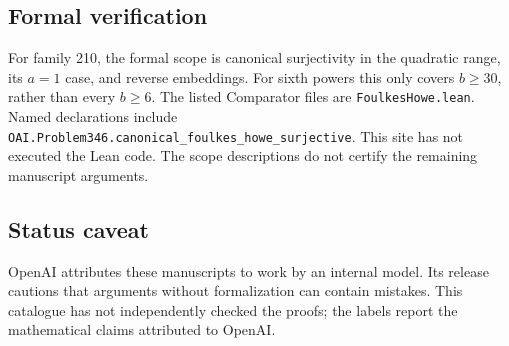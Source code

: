 \documentclass[11pt]{article}
\begin{document}
\subsection{Formal verification}
For family 210, the formal scope is canonical surjectivity in the quadratic range, its $a=1$ case, and reverse embeddings. For sixth powers this only covers $b\geq30$, rather than every $b\geq6$. The listed Comparator files are \texttt{FoulkesHowe.lean}. Named declarations include \texttt{OAI.Problem346.canonical\_foulkes\_howe\_surjective}. This site has not executed the Lean code. The scope descriptions do not certify the remaining manuscript arguments.

\subsection{Status caveat}
OpenAI attributes these manuscripts to work by an internal model. Its release cautions that arguments without formalization can contain mistakes. This catalogue has not independently checked the proofs; the labels report the mathematical claims attributed to OpenAI.
\end{document}
